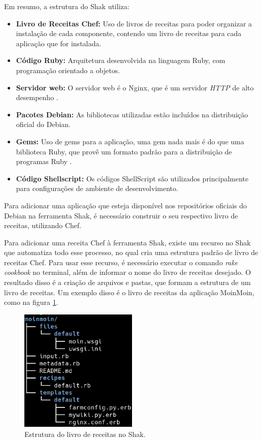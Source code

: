 Em resumo, a estrutura do Shak utiliza:

\begin{itemize}
  \item  \textbf{Livro de Receitas Chef:} Uso de livros de receitas
  para poder organizar a instalação de cada componente, contendo um livro
  de receitas para cada aplicação que for instalada.
  \item  \textbf{Código Ruby:} Arquitetura desenvolvida na linguagem
  Ruby, com programação orientado a objetos.
  \item  \textbf{Servidor web:} O servidor web é o Nginx, que é um
  servidor \textit{HTTP} de alto desempenho \cite{nginx}.
  \item  \textbf{Pacotes Debian:} As bibliotecas utilizadas estão incluídos na distribuição
  oficial do Debian.
  \item  \textbf{Gems:} Uso de gems para a aplicação,
  uma gem nada mais é do que uma biblioteca Ruby, que provê um formato padrão para
  a distribuição de programas Ruby \cite{gem}.
  \item  \textbf{Código Shellscript:} Os códigos ShellScript são utilizados
  principalmente para configurações de ambiente de desenvolvimento. 
\end{itemize}

Para adicionar uma aplicação que esteja disponível nos repositórios oficiais
do Debian na ferramenta Shak, é necessário construir o seu respectivo 
livro de receitas, utilizando Chef. 

Para adicionar uma receita Chef à ferramenta Shak, existe um recurso no Shak que
automatiza todo esse processo, no qual cria uma estrutura padrão de livro de receitas
Chef. Para usar esse recurso, é necessário executar o comando \textit{rake cookbook}
no terminal, além de informar o nome do livro de receitas desejado. O resultado
disso é a criação de arquivos e pastas, que formam a estrutura de um livro de receitas. Um
exemplo disso é o livro de receitas da aplicação MoinMoin, como na figura \ref{fig:x}. 

\begin{figure}[H]
  \centering
  \includegraphics[width=0.5\textwidth]
      {figuras/cookbook}
      \caption{Estrutura do livro de receitas no Shak.}
  \label{fig:x}
\end{figure}

